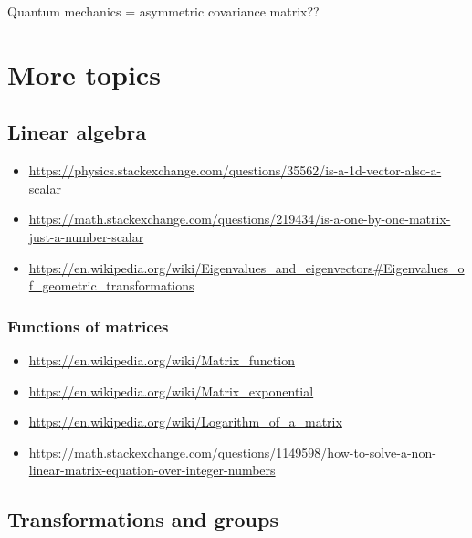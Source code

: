 Quantum mechanics = asymmetric covariance matrix??

\section{More topics}
\subsection{Linear algebra}

\begin{itemize}
\item \url{https://physics.stackexchange.com/questions/35562/is-a-1d-vector-also-a-scalar}
\item \url{https://math.stackexchange.com/questions/219434/is-a-one-by-one-matrix-just-a-number-scalar}
\item \url{https://en.wikipedia.org/wiki/Eigenvalues_and_eigenvectors#Eigenvalues_of_geometric_transformations}
\end{itemize}
\subsubsection{Functions of matrices}
\begin{itemize}
\item \url{https://en.wikipedia.org/wiki/Matrix_function}
\item \url{https://en.wikipedia.org/wiki/Matrix_exponential}
\item \url{https://en.wikipedia.org/wiki/Logarithm_of_a_matrix}
\item \url{https://math.stackexchange.com/questions/1149598/how-to-solve-a-non-linear-matrix-equation-over-integer-numbers}
\end{itemize}
\subsection{Transformations and groups}

